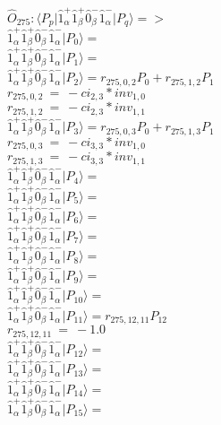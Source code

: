 \documentclass[14pt]{article}
\begin{document}
    $\hat{O}_{275}:  \langle{P_p}\vert \hat{1}_{\alpha}^{+}\hat{1}_{\beta}^{+}\hat{0}_{\beta}^{-}\hat{1}_{\alpha}^{-} \vert{P_q}\rangle => $ \\ 
    $ \hat{1}_{\alpha}^{+}\hat{1}_{\beta}^{+}\hat{0}_{\beta}^{-}\hat{1}_{\alpha}^{-} \vert{P_{0}}\rangle =  $ \\ 
    $ \hat{1}_{\alpha}^{+}\hat{1}_{\beta}^{+}\hat{0}_{\beta}^{-}\hat{1}_{\alpha}^{-} \vert{P_{1}}\rangle =  $ \\ 
    $ \hat{1}_{\alpha}^{+}\hat{1}_{\beta}^{+}\hat{0}_{\beta}^{-}\hat{1}_{\alpha}^{-} \vert{P_{2}}\rangle = {r}_{275,0,2}P_{0}+{r}_{275,1,2}P_{1} $ \\ 
    ${r}_{275,0,2}\ =\ -{ci}_{2,3}*{inv}_{1,0} $ \\ 
    ${r}_{275,1,2}\ =\ -{ci}_{2,3}*{inv}_{1,1} $ \\ 
    $ \hat{1}_{\alpha}^{+}\hat{1}_{\beta}^{+}\hat{0}_{\beta}^{-}\hat{1}_{\alpha}^{-} \vert{P_{3}}\rangle = {r}_{275,0,3}P_{0}+{r}_{275,1,3}P_{1} $ \\ 
    ${r}_{275,0,3}\ =\ -{ci}_{3,3}*{inv}_{1,0} $ \\ 
    ${r}_{275,1,3}\ =\ -{ci}_{3,3}*{inv}_{1,1} $ \\ 
    $ \hat{1}_{\alpha}^{+}\hat{1}_{\beta}^{+}\hat{0}_{\beta}^{-}\hat{1}_{\alpha}^{-} \vert{P_{4}}\rangle =  $ \\ 
    $ \hat{1}_{\alpha}^{+}\hat{1}_{\beta}^{+}\hat{0}_{\beta}^{-}\hat{1}_{\alpha}^{-} \vert{P_{5}}\rangle =  $ \\ 
    $ \hat{1}_{\alpha}^{+}\hat{1}_{\beta}^{+}\hat{0}_{\beta}^{-}\hat{1}_{\alpha}^{-} \vert{P_{6}}\rangle =  $ \\ 
    $ \hat{1}_{\alpha}^{+}\hat{1}_{\beta}^{+}\hat{0}_{\beta}^{-}\hat{1}_{\alpha}^{-} \vert{P_{7}}\rangle =  $ \\ 
    $ \hat{1}_{\alpha}^{+}\hat{1}_{\beta}^{+}\hat{0}_{\beta}^{-}\hat{1}_{\alpha}^{-} \vert{P_{8}}\rangle =  $ \\ 
    $ \hat{1}_{\alpha}^{+}\hat{1}_{\beta}^{+}\hat{0}_{\beta}^{-}\hat{1}_{\alpha}^{-} \vert{P_{9}}\rangle =  $ \\ 
    $ \hat{1}_{\alpha}^{+}\hat{1}_{\beta}^{+}\hat{0}_{\beta}^{-}\hat{1}_{\alpha}^{-} \vert{P_{10}}\rangle =  $ \\ 
    $ \hat{1}_{\alpha}^{+}\hat{1}_{\beta}^{+}\hat{0}_{\beta}^{-}\hat{1}_{\alpha}^{-} \vert{P_{11}}\rangle = {r}_{275,12,11}P_{12} $ \\ 
    ${r}_{275,12,11}\ =\ -1.0 $ \\ 
    $ \hat{1}_{\alpha}^{+}\hat{1}_{\beta}^{+}\hat{0}_{\beta}^{-}\hat{1}_{\alpha}^{-} \vert{P_{12}}\rangle =  $ \\ 
    $ \hat{1}_{\alpha}^{+}\hat{1}_{\beta}^{+}\hat{0}_{\beta}^{-}\hat{1}_{\alpha}^{-} \vert{P_{13}}\rangle =  $ \\ 
    $ \hat{1}_{\alpha}^{+}\hat{1}_{\beta}^{+}\hat{0}_{\beta}^{-}\hat{1}_{\alpha}^{-} \vert{P_{14}}\rangle =  $ \\ 
    $ \hat{1}_{\alpha}^{+}\hat{1}_{\beta}^{+}\hat{0}_{\beta}^{-}\hat{1}_{\alpha}^{-} \vert{P_{15}}\rangle =  $ \\ 
    
\end{document}
